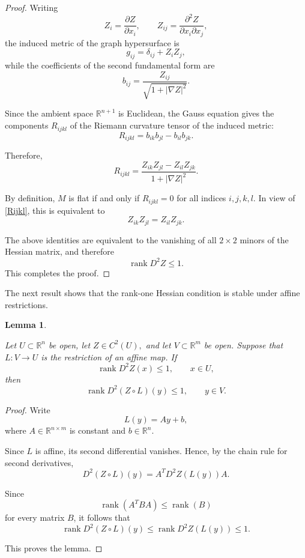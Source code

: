 \documentclass[12pt]{amsart}
\newtheorem{lemma}{Lemma}[section]
\begin{document}
\begin{proof}

Writing
\[
Z_i=\frac{\partial Z}{\partial x_i},
\qquad
Z_{ij}=\frac{\partial^2Z}{\partial x_i\partial x_j},
\]
the induced metric of the graph hypersurface is
\[
g_{ij}
=
\delta_{ij}
+
Z_iZ_j,
\]
while the coefficients of the second fundamental form are
\[
b_{ij}
=
\frac{Z_{ij}}
{\sqrt{1+|\nabla Z|^2}}.
\]

Since the ambient space
\(
\mathbb R^{n+1}
\)
is Euclidean,  the Gauss equation gives the components
\(R_{ijkl}\)
of the Riemann curvature tensor of the induced metric:
\[
R_{ijkl}
=
b_{ik}b_{jl}
-
b_{il}b_{jk}.
\]

Therefore,
\begin{equation}\label{Rijkl}
R_{ijkl}
=
\frac{
Z_{ik}Z_{jl}
-
Z_{il}Z_{jk}
}
{
1+|\nabla Z|^2
}.
\end{equation}

By definition, \(M\) is flat if and only if
\(
R_{ijkl}=0
\)
for all indices \(i,j,k,l\). In view of \eqref{Rijkl},
this is equivalent to
\[
Z_{ik}Z_{jl}
=
Z_{il}Z_{jk}.
\]

The above identities are equivalent to the vanishing of all
\(2\times2\) minors of the Hessian matrix, and therefore
\[
\operatorname{rank}D^2Z\le1.
\]
This completes the proof.

\end{proof}

The next result shows that the rank-one Hessian condition is stable under affine restrictions.

\begin{lemma}\label{lem:affine}

Let
\(
U\subset\mathbb R^{n}
\)
be open,
let
\(
Z\in C^{2}(U),
\)
and let
\(
V\subset\mathbb R^{m}
\)
be open.
Suppose that
\(
L:V\longrightarrow U
\)
is the restriction of an affine map.
If
\[
\operatorname{rank}D^{2}Z(x)\le1,
\qquad
x\in U,
\]
then
\[
\operatorname{rank}
D^{2}(Z\circ L)(y)
\le1,
\qquad
y\in V.
\]

\end{lemma}

\begin{proof}

Write
\[
L(y)=Ay+b,
\]
where
\(
A\in\mathbb R^{n\times m}
\)
is constant and
\(
b\in\mathbb R^{n}.
\)

Since \(L\) is affine, its second differential vanishes.
Hence, by the chain rule for second derivatives,
\[
D^{2}(Z\circ L)(y)
=
A^{T}
D^{2}Z(L(y))
A.
\]

Since
\[
\operatorname{rank}(A^{T}BA)
\le
\operatorname{rank}(B)
\]
for every matrix \(B\), it follows that
\[
\operatorname{rank}
D^{2}(Z\circ L)(y)
\le
\operatorname{rank}
D^{2}Z(L(y))
\le1.
\]

This proves the lemma.

\end{proof}
\end{document}
